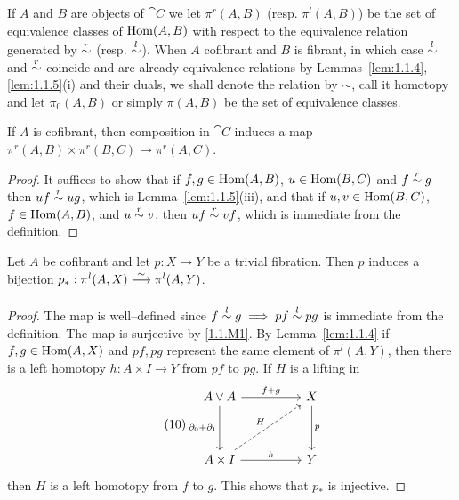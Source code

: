 \documentclass[../main]{subfiles}
\begin{document}
If $A$ and $B$ are objects of $\cat C$ we let $\pi^r(A, B)$ (resp. $\pi^l(A, B)$) be the set of equivalence classes of $\operatorname{Hom}(A, B)$ with respect to the equivalence relation generated by $\overset{r}{\sim}$ (resp. $\overset{l}{\sim}$). When $A$ cofibrant and $B$ is fibrant, in which case $\overset{l}{\sim}$ and $\overset{r}{\sim}$ coincide and are already equivalence relations by Lemmas~\ref{lem:1.1.4}, \ref{lem:1.1.5}(i) and their duals, we shall denote the relation by $\sim$, call it homotopy and let $\pi_0(A, B)$ or simply $\pi(A, B)$ be the set of equivalence classes. 

\begin{lemma}
\label{lem:1.6}
If $A$ is cofibrant, then composition in $\cat C$ induces a map \newline$\pi^r(A, B) \times \pi^r(B, C) \longrightarrow \pi^r(A, C)$.
\end{lemma}

\begin{proof}
It suffices to show that if $f, g \in \operatorname{Hom}(A, B)$, $u \in \operatorname{Hom}(B, C)$ and $f \overset{r}{\sim} g$ then $uf \overset{r}{\sim} ug$, which is Lemma~\ref{lem:1.1.5}(iii), and that if $u, v \in \operatorname{Hom}(B, C)$,\\ $f \in \operatorname{Hom}(A, B)$, and $u \overset{r}{\sim} v$, then $uf \overset{r}{\sim} vf$, which is immediate from the definition.  
\end{proof} 

\begin{lemma}
\label{lem:1.1.7}
Let $A$ be cofibrant and let $p : X \longrightarrow Y$ be a trivial fibration. Then $p$ induces a bijection $p_\ast : \pi^l(A, X) \varrightarrow{\sim} \pi^l(A, Y)$.
\end{lemma} 

\begin{proof}
The map is well--defined since $f \overset{l}{\sim} g \implies pf \overset{l}{\sim} pg$ is immediate from the definition. The map is surjective by \ref{1.1.M1}. By Lemma~\ref{lem:1.1.4} if $f, g \in \operatorname{Hom}(A, X)$ and $pf, pg$ represent the same element of $\pi^l(A, Y)$, then there is a left homotopy $h : A \times I \longrightarrow Y$ from $pf$ to $pg$. If $H$ is a lifting in 
\[\tag{10}\label{diag:1.1.10}
    \begin{tikzcd}
    A \vee A \arrow[dd, "\partial_0 + \partial_1"'] \arrow[rr, "f +g"] &  & X \arrow[dd, "p"] \\
                                                                       &  &                   \\
    A \times I \arrow[rr, "h"] \arrow[rruu, "H", dashed]               &  & Y                
    \end{tikzcd}
\]
then $H$ is a left homotopy from $f$ to $g$. This shows that $p_\ast$ is injective.
\end{proof} 
\end{document}
